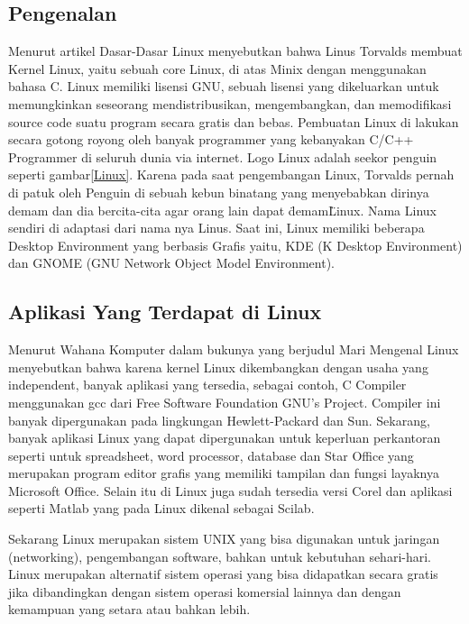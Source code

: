 \subsection{Pengenalan}

Menurut artikel Dasar-Dasar Linux menyebutkan bahwa Linus Torvalds membuat Kernel Linux, yaitu sebuah core Linux, di atas Minix dengan menggunakan bahasa C. Linux memiliki lisensi GNU, sebuah lisensi yang dikeluarkan untuk memungkinkan seseorang mendistribusikan, mengembangkan, dan memodifikasi source code suatu program secara gratis dan bebas. Pembuatan Linux di lakukan secara gotong royong oleh banyak programmer yang kebanyakan C/C++ Programmer di seluruh dunia via internet. Logo Linux adalah seekor penguin seperti gambar\ref{Linux}. Karena pada saat pengembangan Linux, Torvalds pernah di patuk oleh Penguin di sebuah kebun binatang yang menyebabkan dirinya demam dan dia bercita-cita agar orang lain dapat \"demam\" Linux. Nama Linux sendiri di adaptasi dari nama nya Linus. Saat ini, Linux memiliki beberapa Desktop Environment yang berbasis Grafis yaitu, KDE (K Desktop Environment) dan GNOME (GNU Network Object Model Environment). \cite{sofwan2003dasar}

\subsection{Aplikasi Yang Terdapat di Linux}

Menurut Wahana Komputer dalam bukunya yang berjudul Mari Mengenal Linux menyebutkan bahwa karena kernel Linux dikembangkan dengan usaha yang independent, banyak aplikasi yang tersedia, sebagai contoh, C Compiler menggunakan gcc dari Free Software Foundation GNU’s Project. Compiler ini banyak dipergunakan  pada lingkungan Hewlett-Packard dan Sun. Sekarang, banyak aplikasi Linux yang dapat dipergunakan untuk keperluan perkantoran seperti untuk spreadsheet, word processor, database dan Star Office yang merupakan program editor grafis yang memiliki tampilan dan fungsi layaknya Microsoft Office. Selain itu di Linux juga sudah tersedia versi Corel dan aplikasi seperti Matlab yang pada Linux dikenal sebagai Scilab. \cite{komputer2005mari}

Sekarang Linux merupakan sistem UNIX yang bisa digunakan untuk jaringan (networking), pengembangan software, bahkan untuk kebutuhan sehari-hari. Linux merupakan alternatif sistem operasi yang bisa didapatkan secara gratis jika dibandingkan dengan sistem operasi komersial lainnya dan dengan kemampuan yang setara atau bahkan lebih.


